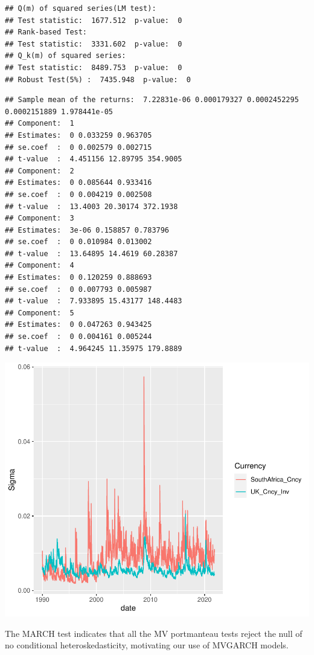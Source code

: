 \documentclass[11pt,preprint, authoryear]{elsarticle}
\numberwithin{equation}{section}
\numberwithin{figure}{section}
\numberwithin{table}{section}
\begin{document}
\begin{verbatim}
## Q(m) of squared series(LM test):  
## Test statistic:  1677.512  p-value:  0 
## Rank-based Test:  
## Test statistic:  3331.602  p-value:  0 
## Q_k(m) of squared series:  
## Test statistic:  8489.753  p-value:  0 
## Robust Test(5%) :  7435.948  p-value:  0
\end{verbatim}

\begin{verbatim}
## Sample mean of the returns:  7.22831e-06 0.000179327 0.0002452295 0.0002151889 1.978441e-05 
## Component:  1 
## Estimates:  0 0.033259 0.963705 
## se.coef  :  0 0.002579 0.002715 
## t-value  :  4.451156 12.89795 354.9005 
## Component:  2 
## Estimates:  0 0.085644 0.933416 
## se.coef  :  0 0.004219 0.002508 
## t-value  :  13.4003 20.30174 372.1938 
## Component:  3 
## Estimates:  3e-06 0.158857 0.783796 
## se.coef  :  0 0.010984 0.013002 
## t-value  :  13.64895 14.4619 60.28387 
## Component:  4 
## Estimates:  0 0.120259 0.888693 
## se.coef  :  0 0.007793 0.005987 
## t-value  :  7.933895 15.43177 148.4483 
## Component:  5 
## Estimates:  0 0.047263 0.943425 
## se.coef  :  0 0.004161 0.005244 
## t-value  :  4.964245 11.35975 179.8889
\end{verbatim}

\includegraphics{Question-5_files/figure-latex/unnamed-chunk-2-1.pdf}

The MARCH test indicates that all the MV portmanteau tests reject the
null of no conditional heteroskedasticity, motivating our use of MVGARCH
models.
\end{document}
